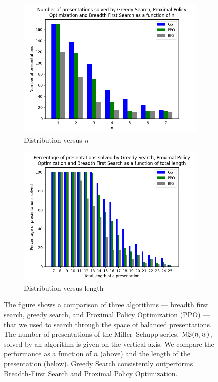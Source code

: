 \begin{figure}
	\centering
	\begin{subfigure}[b]{0.5\textwidth}
		\includegraphics[width=1.1\textwidth]{fig/performance_vs_n.png}
		\caption{Distribution versus $n$}
		\label{fig:performance_vs_n}
	\end{subfigure}
	\begin{subfigure}[b]{0.5\textwidth}
		\centering
		\includegraphics[width=1.1\textwidth]{fig/performance_vs_length.png}
		\caption{Distribution versus length}
		\label{fig:performance_vs_length}
	\end{subfigure}
	\caption{The figure shows a comparison of three algorithms --- breadth first search, greedy search, and Proximal Policy Optimization (PPO) --- that we used to search through the space of balanced presentations. The number of presentations of the Miller--Schupp series, $\text{MS}(n, w)$, solved by an algorithm is given on the vertical axis. We compare the performance as a function of $n$ (above) and the length of the presentation (below). Greedy Search consistently outperforms Breadth-First Search and Proximal Policy Optimization.}
	\label{fig:performance}
\end{figure}

